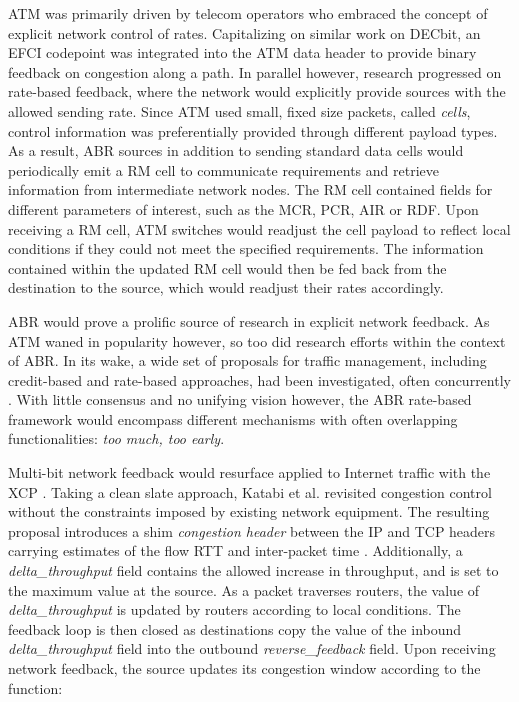 ATM was primarily driven by telecom operators who embraced the concept of explicit network control of rates. 
Capitalizing on similar work on DECbit, an \ac{EFCI} codepoint was integrated into the ATM data header to provide binary feedback on congestion along a path.
In parallel however, research progressed on rate-based feedback, where the network would explicitly provide sources with the allowed sending rate.
Since \ac{ATM} used small, fixed size packets, called \emph{cells}, control information was preferentially provided through different payload types.
As a result, \ac{ABR} sources in addition to sending standard data cells would periodically emit a \ac{RM} cell to communicate requirements and retrieve information from intermediate network nodes.
The \ac{RM} cell contained fields for different parameters of interest, such as the \ac{MCR}, \ac{PCR}, \ac{AIR} or \ac{RDF}.
Upon receiving a \ac{RM} cell, \ac{ATM} switches would readjust the cell payload to reflect local conditions if they could not meet the specified requirements.
The information contained within the updated \ac{RM} cell would then be fed back from the destination to the source, which would readjust their rates accordingly.

\ac{ABR} would prove a prolific source of research in explicit network feedback.
As \ac{ATM} waned in popularity however, so too did research efforts within the context of \ac{ABR}.
In its wake, a wide set of proposals for traffic management, including credit-based and rate-based approaches, had been investigated, often concurrently \cite{Jain:1996p484}.
With little consensus and no unifying vision however, the \ac{ABR} rate-based framework would encompass different mechanisms with often overlapping functionalities: \emph{too much, too early}.

Multi-bit network feedback would resurface applied to Internet traffic with the \ac{XCP} \cite{Katabi:2002p256}.
Taking a clean slate approach, Katabi et al. revisited congestion control without the constraints imposed by existing network equipment.
The resulting proposal introduces a shim \emph{congestion header} between the \ac{IP} and \ac{TCP} headers carrying estimates of the flow \ac{RTT} and inter-packet time \cite{Katabi:2007p485}.
Additionally, a \emph{delta\_throughput} field contains the allowed increase in throughput, and is set to the maximum value at the source.
As a packet traverses routers, the value of \emph{delta\_throughput} is updated by routers according to local conditions.
The feedback loop is then closed as destinations copy the value of the inbound \emph{delta\_throughput} field into the outbound \emph{reverse\_feedback} field.
Upon receiving network feedback, the source updates its congestion window according to the function:

